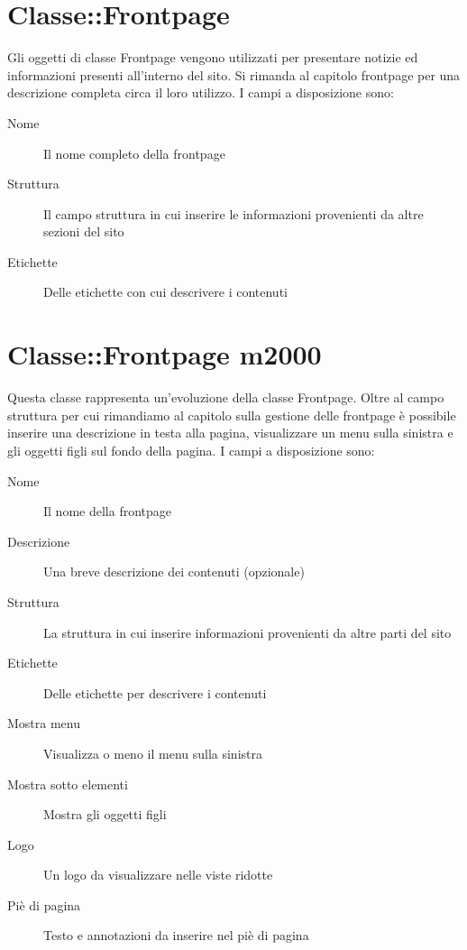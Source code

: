 \section{Classe::Frontpage}
Gli oggetti di classe Frontpage vengono utilizzati per presentare notizie ed informazioni presenti all'interno del sito. Si rimanda al capitolo frontpage per una descrizione completa circa il loro utilizzo. I campi a disposizione sono:
\begin{description}
 \item[Nome] Il nome completo della frontpage
\item[Struttura]Il campo struttura in cui inserire le informazioni provenienti da altre sezioni del sito
\item[Etichette]Delle etichette con cui descrivere i contenuti
\end{description}

\section{Classe::Frontpage m2000}
Questa classe rappresenta un'evoluzione della classe Frontpage. Oltre al campo struttura per cui rimandiamo al capitolo sulla gestione delle frontpage è possibile inserire una descrizione in testa alla pagina, visualizzare un menu sulla sinistra e gli oggetti figli sul fondo della pagina. I campi a disposizione sono:
\begin{description}
\item[Nome] Il nome della frontpage
\item[Descrizione] Una breve descrizione dei contenuti (opzionale)
\item[Struttura]La struttura in cui inserire informazioni provenienti da altre parti del sito
\item[Etichette]Delle etichette per descrivere i contenuti
\item[Mostra menu]Visualizza o meno il menu sulla sinistra
\item[Mostra sotto elementi]Mostra gli oggetti figli
\item[Logo]Un logo da visualizzare nelle viste ridotte
\item[Piè di pagina]Testo e annotazioni da inserire nel piè di pagina
\end{description}

